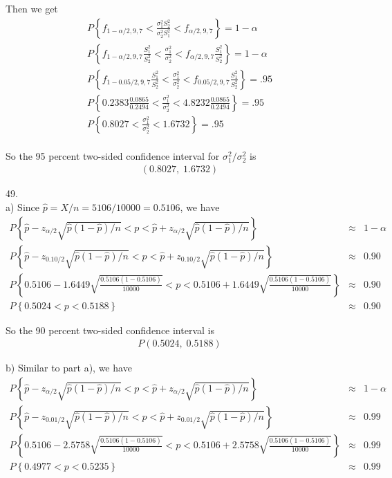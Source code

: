 \documentclass[12pt]{article}
\begin{document}
Then we get
\begin{eqnarray*}
  P \left\{ f_{1 - \alpha / 2, 9, 7}
    < \frac {\sigma_1^2 S_2^2}{\sigma_2^2 S_1^2} <
    f_{\alpha / 2, 9, 7} \right\} = 1 - \alpha \\
  P \left\{ f_{1 - \alpha / 2, 9, 7} \frac {S_1^2}{S_2^2}
    < \frac {\sigma_1^2}{\sigma_2^2} <
    f_{\alpha / 2, 9, 7} \frac {S_1^2}{S_2^2} \right\} = 1 - \alpha \\
  P \left\{ f_{1 - 0.05 / 2, 9, 7} \frac {S_1^2}{S_2^2}
    < \frac {\sigma_1^2}{\sigma_2^2} <
    f_{0.05 / 2, 9, 7} \frac {S_1^2}{S_2^2} \right\} = .95 \\
  P \left\{ 0.2383 \frac{0.0865}{0.2494}
    < \frac {\sigma_1^2}{\sigma_2^2} <
    4.8232 \frac{0.0865}{0.2494} \right\} = .95 \\
  P \left\{ 0.8027 < \frac {\sigma_1^2}{\sigma_2^2} <
    1.6732 \right\} = .95 \\
\end{eqnarray*}

So the 95 percent two-sided confidence interval for $\sigma_1^2 / \sigma_2^2$ is
\begin{eqnarray*}
  \left( 0.8027, \; 1.6732 \right)
\end{eqnarray*}

49. \\
a) Since $\hat{p} = X/n = 5106/10000 = 0.5106$, we have
\begin{eqnarray*}
  P \left\{\hat{p} - z_{\alpha /2} \sqrt {\hat{p}(1-\hat{p}) / n} <
    p < \hat{p} + z_{\alpha /2} \sqrt {\hat{p}(1-\hat{p}) / n}
  \right\} &\approx& 1 - \alpha \\
  P \left\{\hat{p} - z_{0.10 /2} \sqrt {\hat{p}(1-\hat{p}) / n} <
    p < \hat{p} + z_{0.10 /2} \sqrt {\hat{p}(1-\hat{p}) / n}
  \right\} &\approx& 0.90 \\
  P \left\{0.5106 - 1.6449 \sqrt {\frac{0.5106(1-0.5106)}{10000}} <
    p < 0.5106 + 1.6449 \sqrt {\frac{0.5106(1-0.5106)}{10000}}
  \right\} &\approx& 0.90 \\
  P \left\{0.5024 < p < 0.5188 \right\} &\approx& 0.90
\end{eqnarray*}

So the 90 percent two-sided confidence interval is
\begin{eqnarray*}
  P \left(0.5024, \; 0.5188 \right)
\end{eqnarray*}

b) Similar to part a), we have
\begin{eqnarray*}
  P \left\{\hat{p} - z_{\alpha /2} \sqrt {\hat{p}(1-\hat{p}) / n} <
    p < \hat{p} + z_{\alpha /2} \sqrt {\hat{p}(1-\hat{p}) / n}
  \right\} &\approx& 1 - \alpha \\
  P \left\{\hat{p} - z_{0.01 /2} \sqrt {\hat{p}(1-\hat{p}) / n} <
    p < \hat{p} + z_{0.01 /2} \sqrt {\hat{p}(1-\hat{p}) / n}
  \right\} &\approx& 0.99 \\
  P \left\{0.5106 - 2.5758 \sqrt {\frac{0.5106(1-0.5106)}{10000}} <
    p < 0.5106 + 2.5758 \sqrt {\frac{0.5106(1-0.5106)}{10000}}
  \right\} &\approx& 0.99 \\
  P \left\{0.4977 < p < 0.5235 \right\} &\approx& 0.99
\end{eqnarray*}
\end{document}
